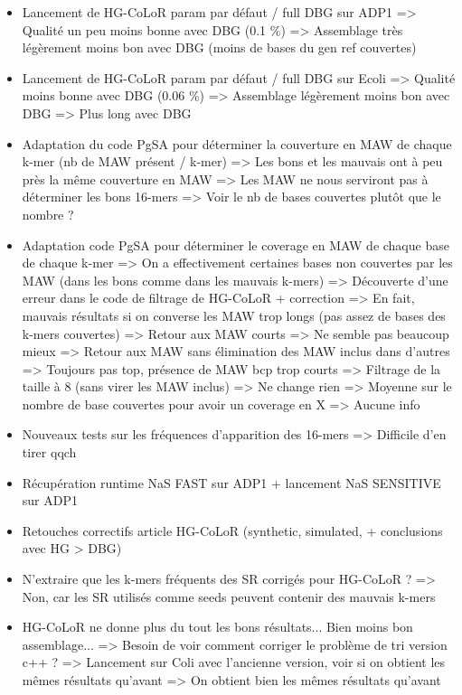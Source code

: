 \documentclass[12pt]{report}
\begin{document}
\begin{itemize}
	\item Lancement de HG-CoLoR param par défaut / full DBG sur ADP1
		  => Qualité un peu moins bonne avec DBG (0.1 \%)
		  => Assemblage très légèrement moins bon avec DBG (moins de bases du gen ref couvertes)
		  
	\item Lancement de HG-CoLoR param par défaut / full DBG sur Ecoli
		  =>	 Qualité moins bonne avec DBG (0.06 \%)
		  => Assemblage légèrement moins bon avec DBG
		  => Plus long avec DBG
		  
	\item Adaptation du code PgSA pour déterminer la couverture en MAW de chaque k-mer (nb de MAW présent / k-mer)
		  => Les bons et les mauvais ont à peu près la même couverture en MAW
		  => Les MAW ne nous serviront pas à déterminer les bons 16-mers
		  => Voir le nb de bases couvertes plutôt que le nombre ?
		  
	\item Adaptation code PgSA pour déterminer le coverage en MAW de chaque base de chaque k-mer
		  => On a effectivement certaines bases non couvertes par les MAW (dans les bons comme dans les mauvais k-mers)
		  => Découverte d'une erreur dans le code de filtrage de HG-CoLoR + correction
		  => En fait, mauvais résultats si on converse les MAW trop longs (pas assez de bases des k-mers couvertes)
		  => Retour aux MAW courts => Ne semble pas beaucoup mieux
		  => Retour aux MAW sans élimination des MAW inclus dans d'autres => Toujours pas top, présence de MAW bcp trop courts
		  => Filtrage de la taille à 8 (sans virer les MAW inclus) => Ne change rien
		  => Moyenne sur le nombre de base couvertes pour avoir un coverage en X => Aucune info
		  
		  
	\item Nouveaux tests sur les fréquences d'apparition des 16-mers
		  => Difficile d'en tirer qqch
	
	\item Récupération runtime NaS FAST sur ADP1 + lancement NaS SENSITIVE sur ADP1
	
	\item Retouches correctifs article HG-CoLoR (synthetic, simulated, + conclusions avec HG > DBG)
	
	\item N'extraire que les k-mers fréquents des SR corrigés pour HG-CoLoR ?
		  => Non, car les SR utilisés comme seeds peuvent contenir des mauvais k-mers
		  
	\item HG-CoLoR ne donne plus du tout les bons résultats... Bien moins bon assemblage...
		  => Besoin de voir comment corriger le problème de tri version c++ ?
		  => Lancement sur Coli avec l'ancienne version, voir si on obtient les mêmes résultats qu'avant
		  		=> On obtient bien les mêmes résultats qu'avant
\end{itemize}
\end{document}
